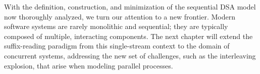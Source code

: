 With the definition, construction, and minimization of the sequential DSA model now thoroughly analyzed, we turn our attention to a new frontier. Modern software systems are rarely monolithic and sequential; they are typically composed of multiple, interacting components. The next chapter will extend the suffix-reading paradigm from this single-stream context to the domain of concurrent systems, addressing the new set of challenges, such as the interleaving explosion, that arise when modeling parallel processes.